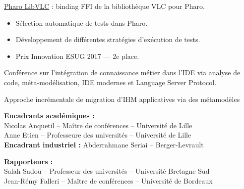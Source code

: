\documentclass[10pt,a4paper,ragged2e,withhyper]{altacv}
\begin{document}
\divider

\href{https://github.com/badetitou/Pharo-LibVLC}{Pharo LibVLC} : binding FFI de la bibliothèque VLC pour Pharo.

\divider

\begin{itemize}
  \item Sélection automatique de tests dans Pharo.
  \item Développement de différentes stratégies d’exécution de tests.
  \item Prix Innovation ESUG 2017 --- 2e place.
\end{itemize}


Conférence sur l’intégration de connaissance métier dans l’IDE via analyse de code, méta-modélisation, IDE modernes et Language Server Protocol.



\divider


\divider



Approche incrémentale de migration d’IHM applicatives via des métamodèles

\textbf{Encadrants académiques :}\\
Nicolas Anquetil -- Maître de conférences -- Université de Lille\\
Anne Etien -- Professeure des universités -- Université de Lille\\
\textbf{Encadrant industriel :} Abderrahmane Seriai -- Berger-Levrault

\textbf{Rapporteurs :}\\
Salah Sadou -- Professeur des universités -- Université Bretagne Sud\\
Jean-Rémy Falleri -- Maître de conférences -- Université de Bordeaux
\end{document}
